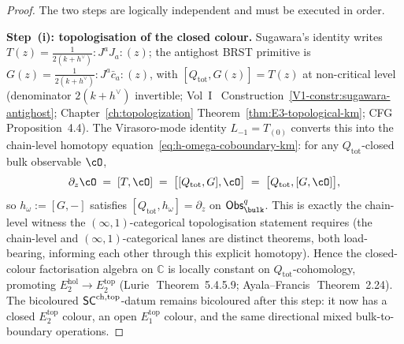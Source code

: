 \begin{proof}
The two steps are logically independent and must be executed in
order.

\medskip\noindent\textbf{Step~(i): topologisation of the closed
colour.}
Sugawara's identity writes
$T(z)=\tfrac{1}{2(k+h^{\vee})}{:}J^aJ_a{:}(z)$; the antighost
BRST primitive is
$G(z)=\tfrac{1}{2(k+h^{\vee})}{:}J^a\bar c_a{:}(z)$, with
$[Q_{\mathrm{tot}},G(z)]=T(z)$ at non-critical level (denominator
$2(k+h^\vee)$ invertible; Vol~I~%
Construction~\ref*{V1-constr:sugawara-antighost};
Chapter~\ref{ch:topologization}
Theorem~\ref{thm:E3-topological-km};
CFG~\cite{CFG2602}\,Proposition~4.4). The Virasoro-mode identity
$L_{-1}=T_{(0)}$ converts this into the chain-level homotopy
equation~\eqref{eq:h-omega-coboundary-km}: for any
$Q_{\mathrm{tot}}$-closed bulk observable $\cO$,
\[
\partial_z\cO
 \;=\;[T,\cO]
 \;=\;\bigl[[Q_{\mathrm{tot}},G],\cO\bigr]
 \;=\;\bigl[Q_{\mathrm{tot}},[G,\cO]\bigr],
\]
so $h_\omega:=[G,-]$ satisfies
$[Q_{\mathrm{tot}},h_\omega]=\partial_z$ on
$\Obs^q_\bulk$. This is exactly the chain-level witness the
$(\infty,1)$-categorical topologisation statement requires
(the chain-level and $(\infty,1)$-categorical lanes are distinct
theorems, both load-bearing, informing each other through this
explicit homotopy). Hence the closed-colour factorisation algebra on
$\mathbb{C}$ is locally constant on $Q_{\mathrm{tot}}$-cohomology,
promoting $E_2^{\mathrm{hol}}\to E_2^{\mathrm{top}}$
(Lurie~\cite{HA}\,Theorem~5.4.5.9;
Ayala--Francis~\cite{AF15}\,Theorem~2.24). The bicoloured
$\mathsf{SC}^{\mathrm{ch},\mathrm{top}}$-datum remains bicoloured after this step: it now has a
closed $E_2^{\mathrm{top}}$ colour, an open $E_1^{\mathrm{top}}$
colour, and the same directional mixed bulk-to-boundary operations.


\end{proof}
